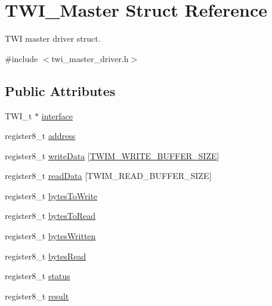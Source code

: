 \hypertarget{struct_t_w_i___master}{\section{T\-W\-I\-\_\-\-Master Struct Reference}
\label{struct_t_w_i___master}
}


T\-W\-I master driver struct.  




{\ttfamily \#include $<$twi\-\_\-master\-\_\-driver.\-h$>$}

\subsection*{Public Attributes}
\begin{DoxyCompactItemize}
\item 
T\-W\-I\-\_\-t $\ast$ \hyperlink{struct_t_w_i___master_ad00bb11bf1747236879a7e733b232838}{interface}
\item 
register8\-\_\-t \hyperlink{struct_t_w_i___master_a927a9325a0f1fed17f3f3d3b2d192f72}{address}
\item 
register8\-\_\-t \hyperlink{struct_t_w_i___master_ad32de221cbcd3561a486be89617dcea3}{write\-Data} \mbox{[}\hyperlink{twi__master__driver_8h_a1847bea28211bab8fdc2d31adcdb82a3}{T\-W\-I\-M\-\_\-\-W\-R\-I\-T\-E\-\_\-\-B\-U\-F\-F\-E\-R\-\_\-\-S\-I\-Z\-E}\mbox{]}
\item 
register8\-\_\-t \hyperlink{struct_t_w_i___master_aac0c87e8f5d8ae80e507ccf0c63f7c71}{read\-Data} \mbox{[}T\-W\-I\-M\-\_\-\-R\-E\-A\-D\-\_\-\-B\-U\-F\-F\-E\-R\-\_\-\-S\-I\-Z\-E\mbox{]}
\item 
register8\-\_\-t \hyperlink{struct_t_w_i___master_a5860f84e0d602e92e216c769d611a9ce}{bytes\-To\-Write}
\item 
register8\-\_\-t \hyperlink{struct_t_w_i___master_a0af10445062189fc458400b2e8effc91}{bytes\-To\-Read}
\item 
register8\-\_\-t \hyperlink{struct_t_w_i___master_a7fad10bdf554d3ab318b83c2f384f29a}{bytes\-Written}
\item 
register8\-\_\-t \hyperlink{struct_t_w_i___master_aaac863ad508d7eeb9bebd2cf0b42b0ac}{bytes\-Read}
\item 
register8\-\_\-t \hyperlink{struct_t_w_i___master_a4213be5b8a0e683ea1ea46b73871af2d}{status}
\item 
register8\-\_\-t \hyperlink{struct_t_w_i___master_ac9aada323447f8e15387c7bf302b2a75}{result}
\end{DoxyCompactItemize}


